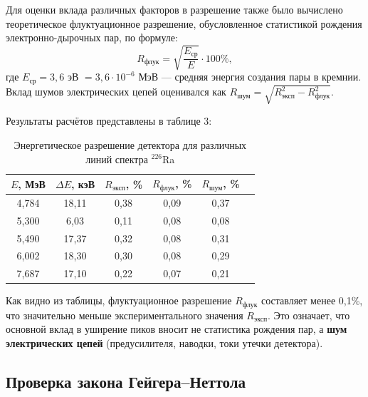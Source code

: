 \documentclass[12pt, a4paper]{article}
\begin{document}
Для оценки вклада различных факторов в разрешение также было вычислено теоретическое флуктуационное разрешение, обусловленное статистикой рождения электронно-дырочных пар, по формуле:
\begin{equation}
    R_{\text{флук}} = \sqrt{\frac{E_{\text{ср}}}{E}} \cdot 100\%,
\end{equation}
где $E_{\text{ср}} = 3,6$ эВ $= 3,6 \cdot 10^{-6}$ МэВ --- средняя энергия создания пары в кремнии. Вклад шумов электрических цепей оценивался как $R_{\text{шум}} = \sqrt{R_{\text{эксп}}^2 - R_{\text{флук}}^2}$.

Результаты расчётов представлены в таблице 3:

\begin{table}[H]
\centering
\caption{Энергетическое разрешение детектора для различных линий спектра $^{226}$Ra}
\label{tab:resolution}
\renewcommand{\arraystretch}{1.2}
\begin{tabular}{|c|c|c|c|c|c|}
\hline
$E$, МэВ & $\Delta E$, кэВ & $R_{\text{эксп}}$, \% & $R_{\text{флук}}$, \% & $R_{\text{шум}}$, \% \\
\hline
4,784 & 18,11 & 0,38 & 0,09 & 0,37 \\
5,300 & 6,03  & 0,11 & 0,08 & 0,08 \\
5,490 & 17,37 & 0,32 & 0,08 & 0,31 \\
6,002 & 18,30 & 0,30 & 0,08 & 0,29 \\
7,687 & 17,10 & 0,22 & 0,07 & 0,21 \\
\hline
\end{tabular}
\end{table}

Как видно из таблицы, флуктуационное разрешение $R_{\text{флук}}$ составляет менее 0,1\%, что значительно меньше экспериментального значения $R_{\text{эксп}}$. Это означает, что основной вклад в уширение пиков вносит не статистика рождения пар, а \textbf{шум электрических цепей} (предусилителя, наводки, токи утечки детектора). 



\subsection*{Проверка закона Гейгера–Неттола}
\end{document}
